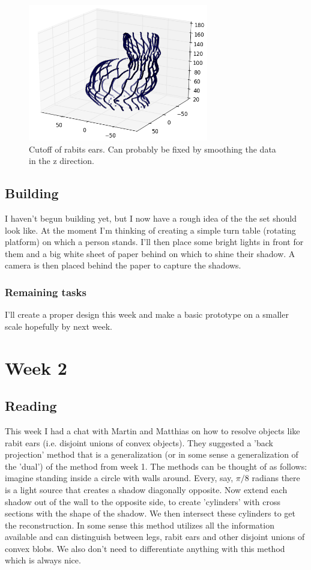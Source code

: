 \documentclass[a4paper]{article}
\begin{document}
\begin{figure}[H]
  \centering
    \includegraphics[width=0.7\textwidth]{figures/ear_and_back_cutoff.png}
    \caption{Cutoff of rabits ears. Can probably be fixed by smoothing the data in the z direction.}
  \label{fig:f2}
\end{figure}

\subsection{Building}
I haven't begun building yet, but I now have a rough idea of the the set should look like. 
At the moment I'm thinking of creating a simple turn table (rotating platform) on which a person stands. I'll then place some bright lights in front for them and a big white sheet of paper behind on which to shine their shadow. 
A camera is then placed behind the paper to capture the shadows.

\subsubsection{Remaining tasks}
I'll create a proper design this week and make a basic prototype on a smaller scale hopefully by next week.

\section{Week 2}
\subsection{Reading}
This week I had a chat with Martin and Matthias on how to resolve objects like rabit ears (i.e. disjoint unions of convex objects).
They suggested a 'back projection' method that is a generalization (or in some sense a generalization of the 'dual') of the method from week 1.
The methods can be thought of as follows: imagine standing inside a circle with walls around. 
Every, say, $\pi/8$ radians there is a light source that creates a shadow diagonally opposite.
Now extend each shadow out of the wall to the opposite side, to create 'cylinders' with cross sections with the shape of the shadow.
We then intersect these cylinders to get the reconstruction.
In some sense this method utilizes all the information available and can distinguish between legs, rabit ears and other disjoint unions of convex blobs. 
We also don't need to differentiate anything with this method which is always nice.
\end{document}
